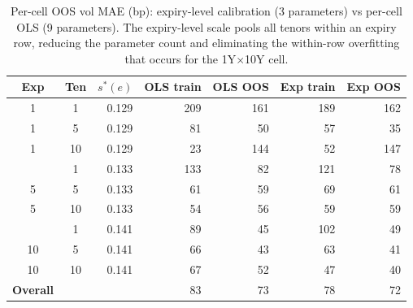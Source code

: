\begin{table}[H]
\centering
\caption{Per-cell OOS vol MAE (bp): expiry-level calibration (3 parameters) vs per-cell OLS (9 parameters). The expiry-level scale pools all tenors within an expiry row, reducing the parameter count and eliminating the within-row overfitting that occurs for the 1Y$\times$10Y cell.}
\label{tab:expiry_comparison}
\begin{tabular}{@{}ccrrrrr@{}}
\toprule
\textbf{Exp} & \textbf{Ten} & \textbf{$s^*(e)$} & \textbf{OLS train} & \textbf{OLS OOS} & \textbf{Exp train} & \textbf{Exp OOS} \\
\midrule
1 & 1 & 0.129 & 209 & 161 & 189 & 162 \\
1 & 5 & 0.129 & 81 & 50 & 57 & 35 \\
1 & 10 & 0.129 & 23 & 144 & 52 & 147 \\
\addlinespace[2pt]
5 & 1 & 0.133 & 133 & 82 & 121 & 78 \\
5 & 5 & 0.133 & 61 & 59 & 69 & 61 \\
5 & 10 & 0.133 & 54 & 56 & 59 & 59 \\
\addlinespace[2pt]
10 & 1 & 0.141 & 89 & 45 & 102 & 49 \\
10 & 5 & 0.141 & 66 & 43 & 63 & 41 \\
10 & 10 & 0.141 & 67 & 52 & 47 & 40 \\
\midrule
\textbf{Overall} & & & 83 & 73 & 78 & 72 \\
\bottomrule
\end{tabular}
\end{table}